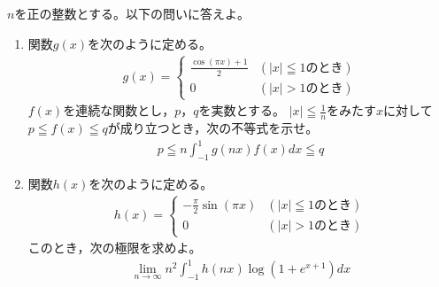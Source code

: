 \documentclass[../../main.tex]{subfiles}
\begin{document}
$n$を正の整数とする。以下の問いに答えよ。
\begin{enumerate}
  \item 関数$g(x)$を次のように定める。
    \begin{align*}
      g(x)=
      \begin{cases} \displaystyle\frac{\cos(\pi x)+1}{2} & (|x|\leqq1\text{のとき}) \\
        0 & (|x|>1\text{のとき})
      \end{cases}
    \end{align*}
    $f(x)$を連続な関数とし，$p$，$q$を実数とする。
    $\displaystyle|x|\leqq\frac{1}{n}$をみたす$x$に対して
    $p \leqq f(x) \leqq q$が成り立つとき，次の不等式を示せ。
    \begin{align*}
      p \leqq n\int_{-1}^1g(nx)f(x)dx \leqq q
    \end{align*}
  \item 関数$h(x)$を次のように定める。
    \begin{align*}
      h(x)=
      \begin{cases} \displaystyle-\frac{\pi}{2}\sin(\pi x) & (|x|\leqq1\text{のとき}) \\
        0 & (|x|>1\text{のとき})
      \end{cases}
    \end{align*}
    このとき，次の極限を求めよ。
    \begin{align*}
      \lim_{n\to\infty}n^2\int_{-1}^1h(nx)\log(1+e^{x+1})dx
    \end{align*}
\end{enumerate}
\end{document}
